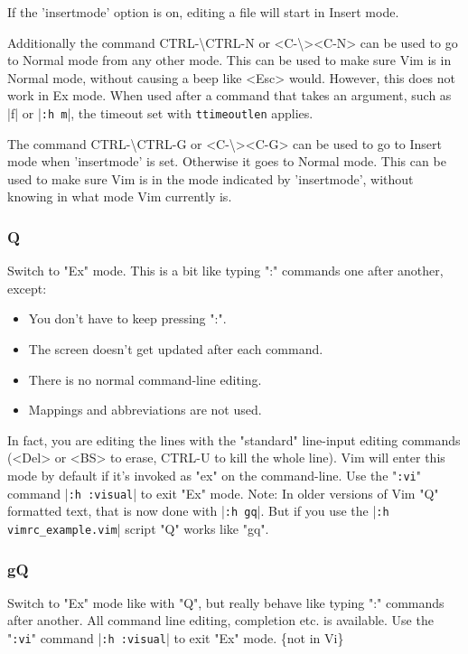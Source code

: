 If the 'insertmode' option is on, editing a file will start in Insert mode.

\label{CTRL-backslash_CTRL-N}
\label{i_CTRL-backslash_CTRL-N}
\label{c_CTRL-backslash_CTRL-N}
\label{v_CTRL-backslash_CTRL-N}
Additionally the command CTRL-\textbackslash CTRL-N or <C-\textbackslash><C-N> can be used to go to Normal mode from any other mode.
This can be used to make sure Vim is in Normal mode, without causing a beep like <Esc> would.
However, this does not work in Ex mode.
When used after a command that takes an argument, such as |f| or |\verb!:h m!|, the timeout set with \verb!ttimeoutlen! applies.

\label{CTRL-backslash_CTRL-G}
\label{i_CTRL-backslash_CTRL-G}
\label{c_CTRL-backslash_CTRL-G}
\label{v_CTRL-backslash_CTRL-G}
The command CTRL-\textbackslash CTRL-G or <C-\textbackslash><C-G> can be used to go to Insert mode when 'insertmode' is set.
Otherwise it goes to Normal mode.
This can be used to make sure Vim is in the mode indicated by 'insertmode', without knowing in what mode Vim currently is.

\subsubsection{Q}
\label{Q}
\label{mode-Ex}
\label{Ex-mode}
\label{Ex}
\label{EX}
\label{E501}
Switch to "Ex" mode.
This is a bit like typing ":" commands one after another, except:
\begin{itemize}
				\item You don't have to keep pressing ":".
				\item The screen doesn't get updated after each command.
				\item There is no normal command-line editing.
				\item Mappings and abbreviations are not used.
\end{itemize}
In fact, you are editing the lines with the "standard" line-input editing commands (<Del> or <BS> to erase, CTRL-U to kill the whole line).
Vim will enter this mode by default if it's invoked as "ex" on the command-line.
Use the "\verb!:vi!" command |\verb!:h :visual!| to exit "Ex" mode.
Note: In older versions of Vim "Q" formatted text, that is now done with |\verb!:h gq!|.
But if you use the
|\verb!:h vimrc_example.vim!| script "Q" works like "gq".

\subsubsection{gQ}
\label{gQ}
Switch to "Ex" mode like with "Q", but really behave like typing ":" commands after another.
All command line editing, completion etc. is available.
Use the "\verb!:vi!" command |\verb!:h :visual!| to exit "Ex" mode.
\{not in Vi\}

